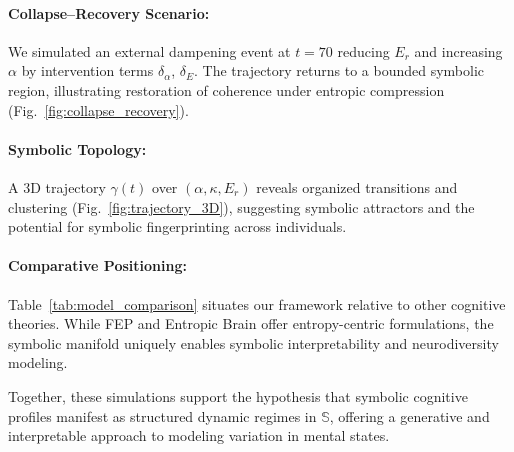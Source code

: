 \paragraph{Collapse–Recovery Scenario:} We simulated an external dampening event at $t = 70$ reducing $E_r$ and increasing $\alpha$ by intervention terms $\delta_\alpha$, $\delta_E$. The trajectory returns to a bounded symbolic region, illustrating restoration of coherence under entropic compression (Fig.~\ref{fig:collapse_recovery}).

\paragraph{Symbolic Topology:} A 3D trajectory $\gamma(t)$ over $(\alpha, \kappa, E_r)$ reveals organized transitions and clustering (Fig.~\ref{fig:trajectory_3D}), suggesting symbolic attractors and the potential for symbolic fingerprinting across individuals.

\paragraph{Comparative Positioning:} Table~\ref{tab:model_comparison} situates our framework relative to other cognitive theories. While FEP and Entropic Brain offer entropy-centric formulations, the symbolic manifold uniquely enables symbolic interpretability and neurodiversity modeling.

Together, these simulations support the hypothesis that symbolic cognitive profiles manifest as structured dynamic regimes in $\mathbb{S}$, offering a generative and interpretable approach to modeling variation in mental states.